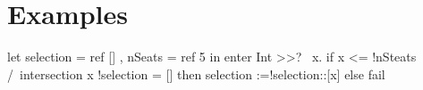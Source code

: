 

\section{Examples}
\label{sec:examples}

\begin{TASK}
  let selection = ref [] , nSeats = ref 5 in
    enter Int >>? \ x. if x <= !nSteats /\ intersection x !selection = []
                       then selection :=!selection::[x] else fail

\end{TASK}
